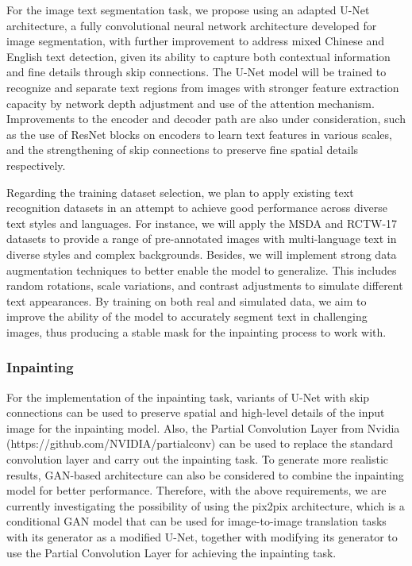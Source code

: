 \documentclass[10pt,twocolumn,letterpaper]{article}
\begin{document}

For the image text segmentation task, we propose using an adapted U-Net architecture, a fully convolutional neural network architecture 
developed for image segmentation, with further improvement to address mixed Chinese and English text detection, given its ability to capture 
both contextual information and fine details through skip connections. 
The U-Net model will be trained to recognize and separate text regions from images with stronger feature extraction capacity by network depth 
adjustment and use of the attention mechanism. Improvements to the encoder and decoder path are also under consideration, 
such as the use of ResNet blocks on encoders to learn text features in various scales, and the strengthening of skip connections to preserve fine spatial details respectively.

Regarding the training dataset selection, we plan to apply existing text recognition datasets in an attempt to achieve good performance 
across diverse text styles and languages. For instance, we will apply the MSDA and RCTW-17 datasets to provide a range of pre-annotated images 
with multi-language text in diverse styles and complex backgrounds. 
Besides, we will implement strong data augmentation techniques to better enable the model to generalize. This includes random rotations, 
scale variations, and contrast adjustments to simulate different text appearances. 
By training on both real and simulated data, we aim to improve the ability of the model to accurately segment text in challenging images, 
thus producing a stable mask for the inpainting process to work with.

\subsubsection{Inpainting}


For the implementation of the inpainting task, variants of U-Net with skip connections can be used to preserve spatial and high-level 
details of the input image for the inpainting model. Also, the Partial Convolution Layer from Nvidia 
(https://github.com/NVIDIA/partialconv) can be used to replace the standard convolution layer and carry out the inpainting task. To 
generate more realistic results, GAN-based architecture can also be considered to combine the inpainting model for better performance.
Therefore, with the above requirements, we are currently investigating the possibility of using the pix2pix architecture,
which is a conditional GAN model that can be used for image-to-image translation tasks with its generator as a modified U-Net, 
together with modifying its generator to use the Partial Convolution Layer for achieving the inpainting task.
\end{document}
